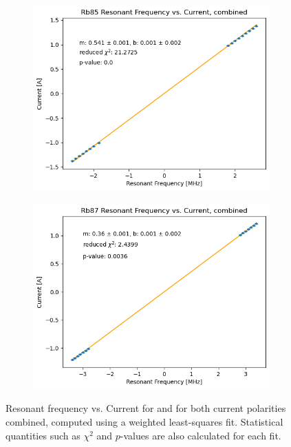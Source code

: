 \documentclass[10pt]{article}
\begin{document}
	\begin{figure}
		\centering
		\begin{subfigure}{0.4\textwidth}
			\includegraphics[scale=0.4]{images/rb85-combined-weighted.png}
			\caption{}
		\end{subfigure}
		\begin{subfigure}{0.4\textwidth}
			\includegraphics[scale=0.4]{images/rb87-combined-weighted.png}
			\caption{}
		\end{subfigure}
		\caption{Resonant frequency vs. Current for  and  for
			both current polarities combined,
			computed using a weighted least-squares fit. 
			Statistical quantities such as \( \chi^2 \) and \( p \)-values are also 
		calculated for each fit.}  
		\label{res-current-combined-weighted}
	\end{figure}
\end{document}
